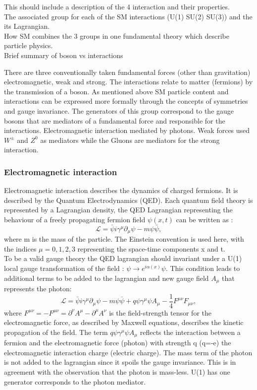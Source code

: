 This should include a description of the 4 interaction and their properties.\\
The associated group for each of the SM interactions (U(1) SU(2) SU(3)) and the its Lagrangian.\\
How SM combines the 3 groups in one fundamental theory which describe particle physics.\\
Brief summary of boson vs interactions

There are three conventionally taken fundamental forces (other than gravitation) electromagnetic, weak and strong. The interactions relate to matter (fermions) by the transmission of a boson. As mentioned above SM particle content and interactions can be expressed more formally through the concepts of symmetries and gauge invariance. The generators of this group correspond to the gauge bosons that are mediators of a fundamental force and responsible for the interactions. Electromagnetic interaction mediated by photons. Weak forces used $W^{\pm}$ and $Z^{0}$ as mediators while the Gluons are mediators for the strong interaction.
\subsubsection{Electromagnetic interaction}
Electromagnetic interaction describes the dynamics of charged fermions. It is described by the Quantum Electrodynamics (QED). Each quantum field theory is represented by a Lagrangian density, the QED Lagrangian representing the behaviour of a freely propagating fermion field $\psi (x,t)$ can be written as : 
\begin{equation}
    \mathcal{L} = \bar{\psi}i\gamma^\mu\partial_\mu\psi - m\psi\bar{\psi},
\end{equation}
where m is the mass of the particle. The Einstein convention is used here, with the indices $\mu= 0,1,2,3$ representing the space-time components x and t. \\ 
To be a valid gauge theory the QED lagrangian should invariant under a U(1) local gauge transformation of the field : $\psi\rightarrow e^{i\alpha(x)}\psi$. This condition leads to additional terms to be added to the lagrangian and new gauge field $A_{\mu}$ that represents the photon:
\begin{equation}
    \mathcal{L} = \bar{\psi}i\gamma^\mu\partial_\mu\psi - m\psi\bar{\psi} + q\psi\gamma^{\mu}\psi A_{\mu} - \frac{1}{4}F^{\mu\nu}F_{\mu\nu},
\end{equation}
where $F^{\mu\nu} = - F^{\mu\nu} = \partial^{\nu}A^{\mu} - \partial^{\mu}A^{\nu}$ is the field-strength tensor for the electromagnetic force, as described by Maxwell equations, describes the kinetic propagation of the field. The term $q\psi\gamma^{\mu}\psi A_{\mu}$ reflects the interaction between a fermion and the electromagnetic force (photon) with strength q (q=-e) the electromagnetic interaction charge (electric charge). The mass term of the photon is not added to the lagrangian since it spoils the gauge invariance. This is in agreement with the observation that the photon is mass-less. U(1) has one generator corresponds to the photon mediator.

